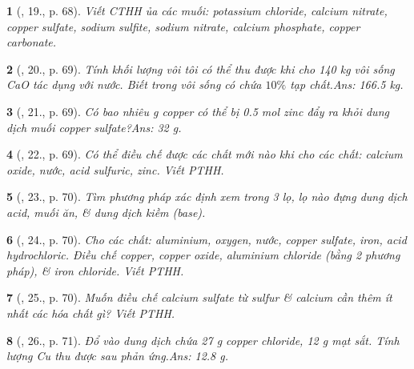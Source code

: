 \documentclass{article}
\newtheorem{baitoan}{}
\begin{document}
\begin{baitoan}[\cite{An_Hoa_Hoc_nang_cao_8_9}, 19., p. 68]
	Viết {\rm CTHH} ủa các muối: potassium chloride, calcium nitrate, copper sulfate, sodium sulfite, sodium nitrate, calcium phosphate, copper carbonate.
\end{baitoan}

\begin{baitoan}[\cite{An_Hoa_Hoc_nang_cao_8_9}, 20., p. 69]
	Tính khối lượng vôi tôi {\rm{}} có thể thu được khi cho {\rm 140 kg} vôi sống {\rm CaO} tác dụng với nước. Biết trong vôi sống có chứa $10\%$ tạp chất.\hfill{\sf Ans: 166.5 kg.}
\end{baitoan}

\begin{baitoan}[\cite{An_Hoa_Hoc_nang_cao_8_9}, 21., p. 69]
	Có bao nhiêu {\rm g} copper có thể bị {\rm0.5 mol} zinc đẩy ra khỏi dung dịch muối copper sulfate?\hfill{\sf Ans: 32 g.}
\end{baitoan}

\begin{baitoan}[\cite{An_Hoa_Hoc_nang_cao_8_9}, 22., p. 69]
	Có thể điều chế được các chất mới nào khi cho các chất: calcium oxide, nước, acid sulfuric, zinc. Viết {\rm PTHH}.
\end{baitoan}

\begin{baitoan}[\cite{An_Hoa_Hoc_nang_cao_8_9}, 23., p. 70]
	Tìm phương pháp xác định xem trong 3 lọ, lọ nào đựng dung dịch acid, muối ăn, \& dung dịch kiềm (base).
\end{baitoan}

\begin{baitoan}[\cite{An_Hoa_Hoc_nang_cao_8_9}, 24., p. 70]
	Cho các chất: aluminium, oxygen, nước, copper sulfate, iron, acid hydrochloric. Điều chế copper, copper oxide, aluminium chloride (bằng 2 phương pháp), \& iron chloride. Viết {\rm PTHH}.
\end{baitoan}

\begin{baitoan}[\cite{An_Hoa_Hoc_nang_cao_8_9}, 25., p. 70]
	Muốn điều chế calcium sulfate từ sulfur \& calcium cần thêm ít nhất các hóa chất gì? Viết {\rm PTHH}.
\end{baitoan}

\begin{baitoan}[\cite{An_Hoa_Hoc_nang_cao_8_9}, 26., p. 71]
	Đổ vào dung dịch chứa {\rm27 g} copper chloride, {\rm12 g} mạt sắt. Tính lượng {\rm Cu} thu được sau phản ứng.\hfill{\sf Ans: 12.8 g.}
\end{baitoan}
\end{document}
